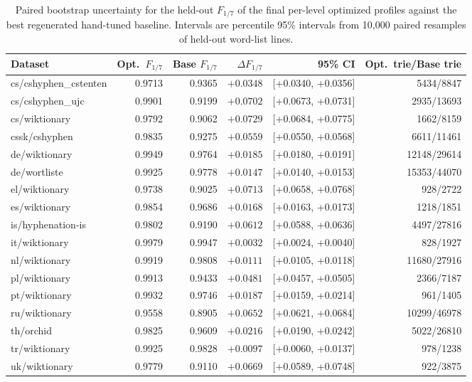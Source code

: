 \begin{table}[tb]
\centering\small
\caption{Paired bootstrap uncertainty for the held-out $F_{1/7}$ of the final per-level optimized profiles against the best regenerated hand-tuned baseline. Intervals are percentile 95\% intervals from 10{,}000 paired resamples of held-out word-list lines.}
\label{tab:final-bootstrap-ci}
\begin{tabular}{l r r r r r}
\toprule
Dataset & Opt.\ $F_{1/7}$ & Base $F_{1/7}$ & $\Delta F_{1/7}$ & 95\% CI & Opt.\ trie/Base trie \\
\midrule
cs/cshyphen\_cstenten & 0.9713 & 0.9365 & $+0.0348$ & [+0.0340, +0.0356] & 5434/8847 \\
cs/cshyphen\_ujc & 0.9901 & 0.9199 & $+0.0702$ & [+0.0673, +0.0731] & 2935/13693 \\
cs/wiktionary & 0.9792 & 0.9062 & $+0.0729$ & [+0.0684, +0.0775] & 1662/8159 \\
cssk/cshyphen & 0.9835 & 0.9275 & $+0.0559$ & [+0.0550, +0.0568] & 6611/11461 \\
de/wiktionary & 0.9949 & 0.9764 & $+0.0185$ & [+0.0180, +0.0191] & 12148/29614 \\
de/wortliste & 0.9925 & 0.9778 & $+0.0147$ & [+0.0140, +0.0153] & 15353/44070 \\
el/wiktionary & 0.9738 & 0.9025 & $+0.0713$ & [+0.0658, +0.0768] & 928/2722 \\
es/wiktionary & 0.9854 & 0.9686 & $+0.0168$ & [+0.0163, +0.0173] & 1218/1851 \\
is/hyphenation-is & 0.9802 & 0.9190 & $+0.0612$ & [+0.0588, +0.0636] & 4497/27816 \\
it/wiktionary & 0.9979 & 0.9947 & $+0.0032$ & [+0.0024, +0.0040] & 828/1927 \\
nl/wiktionary & 0.9919 & 0.9808 & $+0.0111$ & [+0.0105, +0.0118] & 11680/27916 \\
pl/wiktionary & 0.9913 & 0.9433 & $+0.0481$ & [+0.0457, +0.0505] & 2366/7187 \\
pt/wiktionary & 0.9932 & 0.9746 & $+0.0187$ & [+0.0159, +0.0214] & 961/1405 \\
ru/wiktionary & 0.9558 & 0.8905 & $+0.0652$ & [+0.0621, +0.0684] & 10299/46978 \\
th/orchid & 0.9825 & 0.9609 & $+0.0216$ & [+0.0190, +0.0242] & 5022/26810 \\
tr/wiktionary & 0.9925 & 0.9828 & $+0.0097$ & [+0.0060, +0.0137] & 978/1238 \\
uk/wiktionary & 0.9779 & 0.9110 & $+0.0669$ & [+0.0589, +0.0748] & 922/3875 \\
\bottomrule
\end{tabular}
\end{table}
